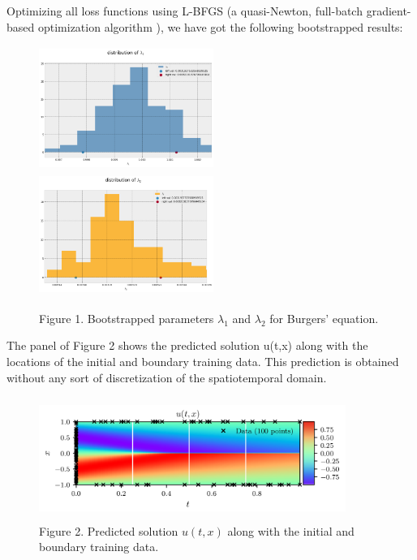 \documentclass{beamer}
\def\\{}%
\begin{document}
\begin{frame}

Optimizing all loss functions using L-BFGS (a quasi-Newton, full-batch gradient-based optimization algorithm \cite{Liu1989Nocedal}), we have got the following bootstrapped results:

\begin{figure}
\centering
\includegraphics[width = 5.7cm , height = 4cm]{images/l1_confidence.png}
\includegraphics[width = 5.7cm , height = 4cm]{images/l2_confidence.png}
\\
\caption{Figure 1. Bootstrapped parameters $\lambda_1$ and $\lambda_2$ for Burgers' equation.}
\end{figure}

\end{frame}

\begin{frame}

The panel of Figure 2 shows the predicted solution u(t,x) along with the
locations of the initial and boundary training data. This prediction is obtained
without any sort of discretization of the spatiotemporal domain. 

\begin{figure}
\centering
\includegraphics[width = 10cm , height = 4cm]{images/predicted_sol_burgers.png}
\\
\caption{Figure 2. Predicted solution $u(t,x)$ along with the initial and
boundary training data.}
\end{figure}

\end{frame}
\end{document}

